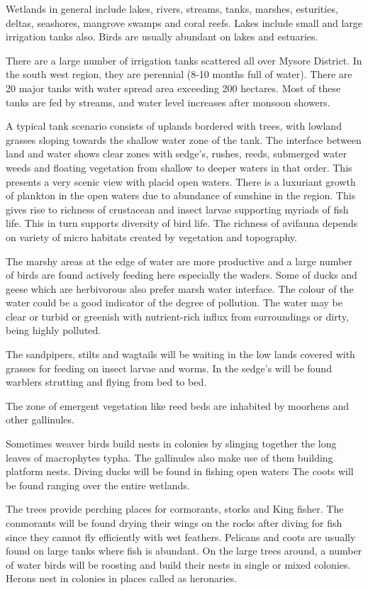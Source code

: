 Wetlands in general include lakes, rivers, streams, 
tanks, marshes, esturities, deltas, seashores, mangrove swamps 
and coral reefs. Lakes include small and large irrigation 
tanks also. Birds are usually abundant on lakes and estuaries. 

There are a large number of irrigation tanks scattered 
all over Mysore District. In the south west region, they are 
perennial (8-10 months full of water). There are 20 major 
tanks with water spread area exceeding 200 hectares. Most 
of these tanks are fed by streams, and water level increases 
after monsoon showers. 

A typical tank scenario consists of uplands bordered 
with trees, with lowland grasses sloping towards the shallow 
water zone of the tank. The interface between land and water 
shows clear zones with sedge's, rushes, reeds, submerged water 
weeds and floating vegetation from shallow to deeper waters 
in that order. This presents a very scenic view with placid 
open waters. There is a luxuriant growth of plankton in the 
open waters due to abundance of sunshine in the region. This 
gives rise to richness of crustacean and insect larvae 
supporting myriads of fish life. This in turn supports 
diversity of bird life. The richness of avifauna depends on 
variety of micro habitats created by vegetation and 
topography. 

The marshy areas at the edge of water are more
productive and a large number of birds are found actively 
feeding here especially the waders. Some of ducks and geese 
which are herbivorous also prefer marsh water interface. The 
colour of the water could be a good indicator of the degree 
of pollution. The water may be clear or turbid or greenish 
with nutrient-rich influx from surroundings or dirty, being 
highly polluted. 

The sandpipers, stilts and wagtails will be waiting in 
the low lands covered with grasses for feeding on insect 
larvae and worms. In the sedge's will be found warblers 
strutting and flying from bed to bed. 

The zone of emergent vegetation like reed beds are 
inhabited by moorhens and other gallinules. 

Sometimes weaver birds build nests in colonies by 
slinging together the long leaves of macrophytes typha. The 
gallinules also make use of them building platform nests. 
Diving ducks will be found in fishing open waters The coots 
will be found ranging over the entire wetlands. 

The trees provide perching places for cormorants, storks 
and King fisher. The conmorants will be found drying their 
wings on the rocks after diving for fish since they cannot 
fly efficiently with wet feathers. Pelicans and coots are 
usually found on large tanks where fish is abundant. On the 
large trees around, a number of water birds will be roosting 
and build their nests in single or mixed colonies. Herons 
nest in colonies in places called as heronaries. 

